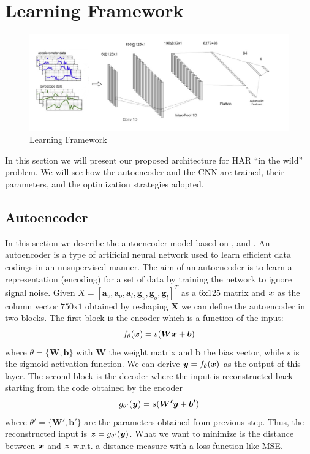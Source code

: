 \section{Learning Framework}
\label{sec:learning-framework}

\begin{figure}[h]
	\centering
	\includegraphics[width=1\textwidth]{images/full_architecture.jpg}
	\caption{Learning Framework}
	\label{fig:proposed-architecture}
\end{figure}

In this section we will present our proposed architecture for HAR ``in
the wild'' problem. We will see how the autoencoder and the CNN are
trained, their parameters, and the optimization strategies adopted.

\subsection{Autoencoder}
\label{subsec:autoencoder}

In this section we describe the autoencoder model based on
\cite{vincent2010stacked}, \cite{gu2018locomotion} and
\cite{gao2019human}. An autoencoder is a type of artificial neural
network used to learn efficient data codings in an unsupervised
manner. The aim of an autoencoder is to learn a representation
(encoding) for a set of data by training the network to ignore signal
noise. Given $X = [ \boldsymbol{a}_v, \boldsymbol{a}_o,
  \boldsymbol{a}_l, \boldsymbol{g}_v, \boldsymbol{g}_o,
  \boldsymbol{g}_l ]^T$ as a $6\text{x}125$ matrix and $\boldsymbol{x}$ as the
column vector $750\text{x}1$ obtained by reshaping $\boldsymbol{X}$ we
can define the autoencoder in two blocks. The first block is the
encoder which is a function of the input:
\begin{equation}
  f_\theta(\boldsymbol{x}) = s(\boldsymbol{W}\boldsymbol{x} + \boldsymbol{b})
\end{equation}
where $\theta = \{ \boldsymbol{W}, \boldsymbol{b} \}$ with
$\boldsymbol{W}$ the weight matrix and $\boldsymbol{b}$ the bias
vector, while $s$ is the sigmoid activation function. We
can derive $\boldsymbol{y} = f_\theta(\boldsymbol{x})$ as the output of this
layer. The second block is the decoder where the input is
reconstructed back starting from the code obtained by the encoder
\begin{equation}
  g_{\theta'}(\boldsymbol{y}) = s(\boldsymbol{W'}\boldsymbol{y} + \boldsymbol{b'})
\end{equation}
where $\theta' = \{ \boldsymbol{W'}, \boldsymbol{b'} \}$ are the
parameters obtained from previous step. Thus, the reconstructed input
is $\boldsymbol{z} = g_{\theta'}(\boldsymbol{y})$. What we want to minimize is the distance
between $\boldsymbol{x}$ and $\boldsymbol{z}$ w.r.t. a distance measure with a loss function
like MSE.

